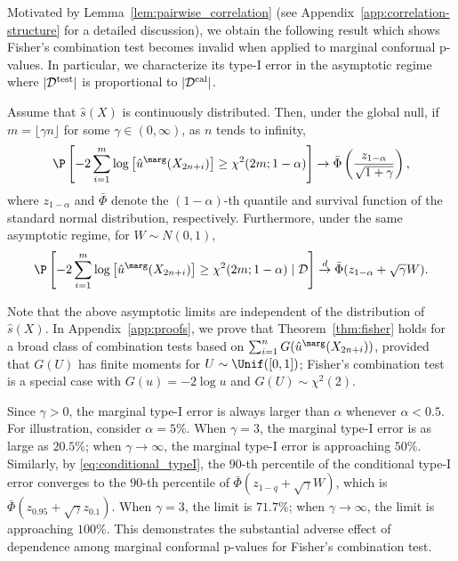 Motivated by Lemma~\ref{lem:pairwise_correlation} (see Appendix~\ref{app:correlation-structure} for a detailed discussion), we obtain the following result which shows Fisher's combination test becomes invalid when applied to marginal conformal p-values. In particular, we characterize its type-I error in the asymptotic regime where $|\mathcal{D}^{\textnormal{test}}|$ is proportional to $|\mathcal{D}^{\textnormal{cal}}|$.
\begin{thm}\label{thm:fisher}
Assume that $\hat{s}(X)$ is continuously distributed. Then, under the global null, if $m = \lfloor\gamma n\rfloor$ for some $\gamma \in (0, \infty)$, as $n$ tends to infinity,
\begin{equation*}
\P\left[ -2 \sum_{i=1}^{m} \log \left[ \hat{u}^\marg(X_{2n+i}) \right] \ge \chi^2(2m; 1 - \alpha) \right] \rightarrow  \bar{\Phi}\left(\frac{z_{1 - \alpha}}{\sqrt{1 + \gamma}}\right),
\end{equation*}
where $z_{1 - \alpha}$ and $\bar{\Phi}$ denote the $(1 - \alpha)$-th quantile and survival function of the standard normal distribution, respectively. Furthermore, under the same asymptotic regime, for $W\sim N(0, 1)$,
\begin{equation}\label{eq:conditional_typeI}
\P\left[ -2 \sum_{i=1}^{m} \log \left[\hat{u}^\marg(X_{2n+i})\right] \ge \chi^2(2m; 1 - \alpha)\mid \mathcal{D} \right] \stackrel{d}{\rightarrow}\bar{\Phi}(z_{1 - \alpha} + \sqrt{\gamma} W).
\end{equation}
\end{thm}
Note that the above asymptotic limits are independent of the distribution of $\hat{s}(X)$. In Appendix~\ref{app:proofs}, we prove that Theorem~\ref{thm:fisher} holds for a broad class of combination tests based on $\sum_{i=1}^{n}G(\hat{u}^\marg(X_{2n+i}))$, provided that $G(U)$ has finite moments for $U\sim \Unif([0, 1])$; Fisher's combination test is a special case with $G(u) = -2\log u$ and $G(U)\sim \chi^2(2)$.

 Since $\gamma > 0$, the marginal type-I error is always larger than $\alpha$ whenever $\alpha < 0.5$. For illustration, consider $\alpha = 5\%$. When $\gamma = 3$, the marginal type-I error is as large as $20.5\%$; when $\gamma \rightarrow\infty$, the marginal type-I error is approaching $50\%$. Similarly, by \eqref{eq:conditional_typeI}, the $90$-th percentile of the conditional type-I error converges to the $90$-th percentile of $\bar{\Phi}(z_{1 - q} + \sqrt{\gamma} W)$, which is $\bar{\Phi}(z_{0.95} + \sqrt{\gamma}z_{0.1})$. When $\gamma = 3$, the limit is $71.7\%$; when $\gamma \rightarrow \infty$, the limit is approaching $100\%$. This demonstrates the substantial adverse effect of dependence among marginal conformal p-values for Fisher's combination test.


